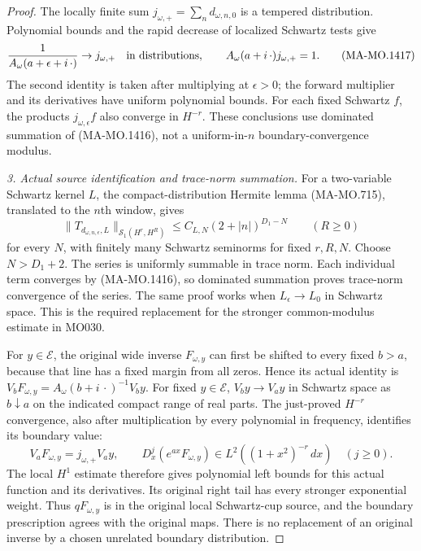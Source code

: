 \begin{proof}
The locally finite sum $j_{\omega,+}=\sum_n d_{\omega,n,0}$
is a tempered distribution.  Polynomial bounds and the rapid
decrease of localized Schwartz tests give
\[
 \frac1{A_\omega(a+\epsilon+i\,\cdot)}\to j_{\omega,+}
          \quad\hbox{in distributions},\qquad
                 A_\omega(a+i\,\cdot)j_{\omega,+}=1.
 \tag{MA-MO.1417}
\]
The second identity is taken after multiplying at $\epsilon>0$;
the forward multiplier and its derivatives have uniform polynomial
bounds.  For each fixed Schwartz $f$, the products
$j_{\omega,\epsilon}f$ also converge in $H^{-r}$.
These conclusions use dominated summation of (MA-MO.1416),
not a uniform-in-$n$ boundary-convergence modulus.

\emph{3. Actual source identification and trace-norm summation.}
For a two-variable Schwartz kernel $L$, the compact-distribution
Hermite lemma (MA-MO.715), translated to the $n$th window, gives
\[
 \|T_{d_{\omega,n,\epsilon},L}\|_{\mathcal S_1(H^r,H^R)}
     \le C_{L,N}(2+|n|)^{D_1-N}\qquad(R\ge0)
 \tag{MA-MO.1418}
\]
for every $N$, with finitely many Schwartz seminorms for fixed
$r,R,N$.  Choose $N>D_1+2$.  The series is uniformly summable
in trace norm.  Each individual term converges by
(MA-MO.1416), so dominated summation proves trace-norm
convergence of the series.  The same proof works when
$L_\epsilon\to L_0$ in Schwartz space.  This is the required
replacement for the stronger common-modulus estimate in MO030.

For $y\in\mathcal E$, the original wide inverse $F_{\omega,y}$
can first be shifted to every fixed $b>a$, because that line
has a fixed margin from all zeros.  Hence its actual identity is
$V_bF_{\omega,y}=A_\omega(b+i\,\cdot)^{-1}V_by$.
For fixed $y\in\mathcal E$, $V_by\to V_ay$ in Schwartz space
as $b\downarrow a$ on the indicated compact range of real parts.
The just-proved $H^{-r}$ convergence, also after multiplication
by every polynomial in frequency, identifies its boundary value:
\[
 V_aF_{\omega,y}=j_{\omega,+}V_ay,\qquad
 D_x^j(e^{ax}F_{\omega,y})\in
                   L^2((1+x^2)^{-r}\,dx)\quad(j\ge0).
 \tag{MA-MO.1419}
\]
The local $H^1$ estimate therefore gives polynomial left bounds
for this actual function and its derivatives.  Its original
right tail has every stronger exponential weight.  Thus
$qF_{\omega,y}$ is in the original local Schwartz-cup source,
and the boundary prescription agrees with the original maps.
There is no replacement of an original inverse by a chosen
unrelated boundary distribution.


\end{proof}

